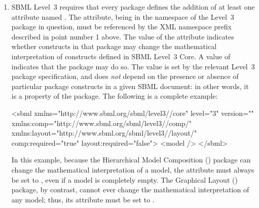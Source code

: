 \begin{enumerate}
\item SBML Level~3 requires that every package defines the
  addition of at least one attribute named .  The
  attribute, being in the namespace of the Level~3 package in
  question, must be referenced by the XML namespace prefix
  described in point number 1 above.  The value of the
   attribute indicates whether constructs in that package may change the mathematical interpretation of constructs defined in SBML Level~3 Core.  A  value of  indicates that the package may do so.  The value is set by the relevant Level~3 package specification, and does \emph{not} depend on the presence or absence of particular package constructs in a given SBML document: in other words, it is a property of the package.
  The following is a complete example:
  \begin{example}
<sbml xmlns="http://www.sbml.org/sbml/level3/\thisvlc/core" level="3" version="\sbmlversionnum"
      xmlns:comp="http://www.sbml.org/sbml/level3/\thisvlc/comp/\thisvlc"
      xmlns:layout="http://www.sbml.org/sbml/level3/\thisvlc/layout/\thisvlc"
      comp:required="true" layout:required="false">
  <model />
</sbml>   \end{example}

In this example, because the Hierarchical Model Composition () package can change the mathematical interpretation of a model, the  attribute must always be set to , even if a model is completely empty.  The Graphical Layout () package, by contrast, cannot ever change the mathematical interpretation of any model; thus, its  attribute must be set to .


\end{enumerate}
